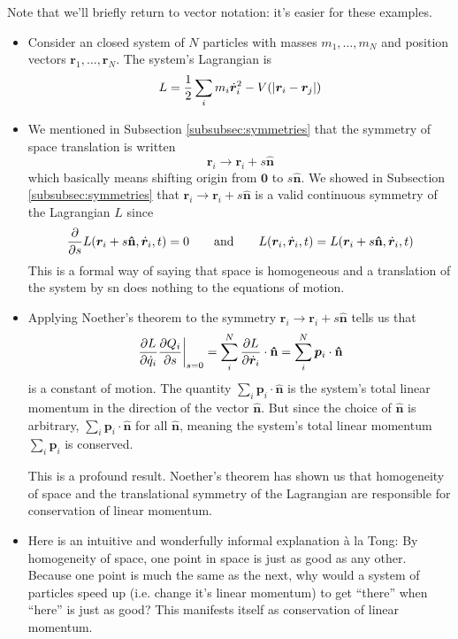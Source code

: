 \documentclass[11pt, a4paper]{article}
\newcommand{\eqtext}[1]{\qquad \text{#1} \qquad}
\newcommand{\bdot}[1]{\dot{\bm{#1}}} %
\newcommand{\uvec}[1]{\bm{\hat{\mathbf{#1}}}} %
\begin{document}
\smallskip 
Note that we'll briefly return to vector notation: it's easier for these examples.
\begin{itemize}
	\item  Consider an closed system of $ N $ particles with masses $ m_1, \ldots, m_N$ and position vectors $ \bm{r}_1, \ldots, \bm{r}_{N} $. The system's Lagrangian is
	\begin{equation*}
		L = \frac{1}{2}\sum_{i}m_{i} \bdot{r}_{i}^{2} - V(\abs{\bm{r}_{i} - \bm{r}_{j}})
	\end{equation*}
	
	\item We mentioned in Subsection \ref{subsubsec:symmetries} that the symmetry of space translation is written
	\begin{equation*}
		\bm{r}_{i} \to \bm{r}_{i} + s \uvec{n}
	\end{equation*}
	which basically means shifting origin from $ \bm{0} $ to $ s \uvec{n} $. We showed in Subsection \ref{subsubsec:symmetries} that $ \bm{r}_{i} \to \bm{r}_{i} + s \uvec{n} $ is a valid continuous symmetry of the Lagrangian $ L $ since
	\begin{equation*}
		\pdv{}{s}	L(\bm{r}_{i} + s \uvec{n}, \bdot{r}_{i}, t)  = 0 \eqtext{and} L(\bm{r}_{i}, \bdot{r}_{i}, t) = L(\bm{r}_{i} + s \uvec{n}, \bdot{r}_{i}, t)
	\end{equation*}	
	This is a formal way of saying that space is homogeneous and a translation of the system by sn does nothing to the equations of motion. 
	
	\item Applying Noether's theorem to the symmetry $ \bm{r}_{i} \to \bm{r}_{i} + s \uvec{n} $ tells us that
	\begin{equation*}
		\eval{\pdv{L}{\dot{q}_{i}} \pdv{Q_{i}}{s}}_{s=0} = \sum_{i}^{N} \pdv{L}{\bdot{r}_{i}} \cdot \uvec{n} =  \sum_{i}^{N} \bm{p}_{i} \cdot \uvec{n} 
	\end{equation*}
	is a constant of motion. The quantity $ \sum_{i} \bm{p}_{i} \cdot \uvec{n}  $ is the system's total linear momentum in the direction of the vector $ \uvec{n} $. But since the choice of $ \uvec{n} $ is arbitrary, $ \sum_{i} \bm{p}_{i} \cdot \uvec{n} $ for all $ \uvec{n} $, meaning the system's total linear momentum $ \sum_{i} \bm{p}_{i}$ is conserved. 
	
	This is a profound result. Noether's theorem has shown us that homogeneity of space and the translational symmetry of the Lagrangian are responsible for conservation of linear momentum.
	
	\item Here is an intuitive and wonderfully informal explanation \`{a} la Tong: By homogeneity of space, one point in space is just as good as any other. Because one point is much the same as the next, why would a system of particles speed up (i.e. change it's linear momentum) to get ``there'' when ``here'' is just as good? This manifests itself as conservation of linear momentum.
		
\end{itemize}
\end{document}
